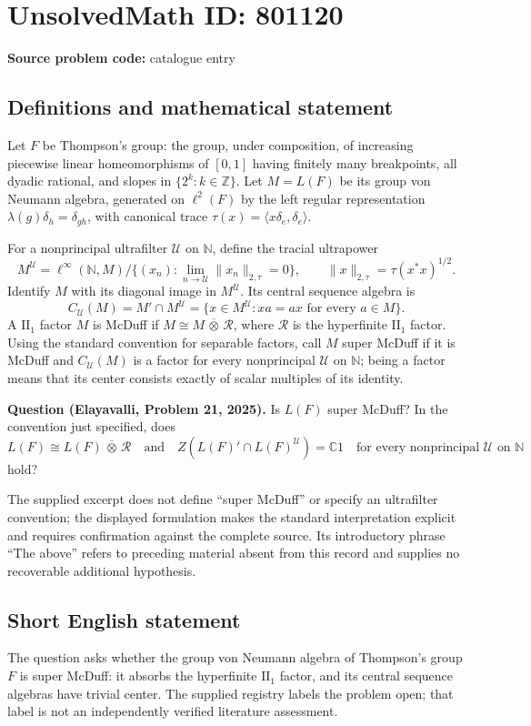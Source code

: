 \documentclass[11pt]{article}
\newcommand{\N}{\mathbb{N}}
\newcommand{\Z}{\mathbb{Z}}
\newcommand{\C}{\mathbb{C}}
\begin{document}
\section*{UnsolvedMath ID: 801120}
\textbf{Source problem code:} catalogue entry
\subsection{Definitions and mathematical statement}
Let \(F\) be Thompson's group: the group, under composition, of increasing piecewise linear homeomorphisms of \([0,1]\) having finitely many breakpoints, all dyadic rational, and slopes in \(\{2^k:k\in\Z\}\). Let \(M=L(F)\) be its group von Neumann algebra, generated on \(\ell^2(F)\) by the left regular representation \(\lambda(g)\delta_h=\delta_{gh}\), with canonical trace \(\tau(x)=\langle x\delta_e,\delta_e\rangle\).

For a nonprincipal ultrafilter \(\mathcal U\) on \(\N\), define the tracial ultrapower
\[
M^{\mathcal U}=\ell^\infty(\N,M)\big/\{(x_n):\lim_{n\to\mathcal U}\|x_n\|_{2,\tau}=0\},\qquad \|x\|_{2,\tau}=\tau(x^*x)^{1/2}.
\]
Identify \(M\) with its diagonal image in \(M^{\mathcal U}\). Its central sequence algebra is
\[
C_{\mathcal U}(M)=M'\cap M^{\mathcal U}=\{x\in M^{\mathcal U}:xa=ax\text{ for every }a\in M\}.
\]
A \(\mathrm{II}_1\) factor \(M\) is McDuff if \(M\cong M\,\overline\otimes\,\mathcal R\), where \(\mathcal R\) is the hyperfinite \(\mathrm{II}_1\) factor. Using the standard convention for separable factors, call \(M\) super McDuff if it is McDuff and \(C_{\mathcal U}(M)\) is a factor for every nonprincipal \(\mathcal U\) on \(\N\); being a factor means that its center consists exactly of scalar multiples of its identity.

\textbf{Question (Elayavalli, Problem 21, 2025).} Is \(L(F)\) super McDuff? In the convention just specified, does
\[
L(F)\cong L(F)\,\overline\otimes\,\mathcal R
\quad\text{and}\quad
Z\!\left(L(F)'\cap L(F)^{\mathcal U}\right)=\C1
\quad\text{for every nonprincipal }\mathcal U\text{ on }\N
\]
hold?

The supplied excerpt does not define ``super McDuff'' or specify an ultrafilter convention; the displayed formulation makes the standard interpretation explicit and requires confirmation against the complete source. Its introductory phrase ``The above'' refers to preceding material absent from this record and supplies no recoverable additional hypothesis.
\subsection{Short English statement}
The question asks whether the group von Neumann algebra of Thompson's group \(F\) is super McDuff: it absorbs the hyperfinite \(\mathrm{II}_1\) factor, and its central sequence algebras have trivial center. The supplied registry labels the problem open; that label is not an independently verified literature assessment.
\end{document}

